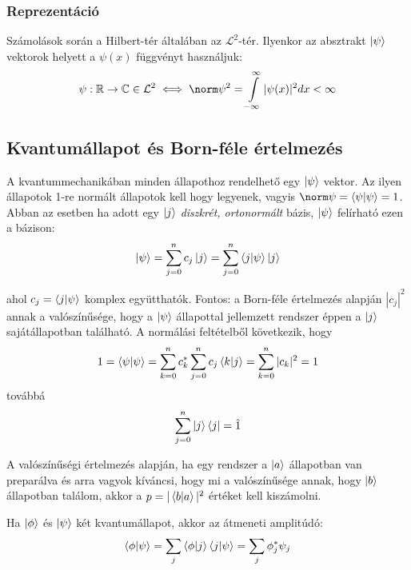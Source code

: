 \subsubsection{Reprezentáció}
Számolások során a Hilbert-tér általában az $\mathcal{L}^2$-tér.
Ilyenkor az absztrakt $\ket\psi$ vektorok helyett a $\psi(x)$ függvényt használjuk:
\begin{equation}
    \psi: \mathbb{R} \rightarrow \mathbb{C} \in \mathcal{L}^2 \iff \norm \psi^2 = \int\limits_{-\infty}^{\infty} |\psi(x)|^2 dx < \infty
\end{equation}

\subsection{Kvantumállapot és Born-féle értelmezés}
A kvantummechanikában minden állapothoz rendelhető egy $\ket\psi$ vektor.
Az ilyen állapotok 1-re normált állapotok kell hogy legyenek, vagyis
$\norm \psi = \braket{\psi|\psi} = 1$.
Abban az esetben ha adott egy $\ket j$ \textit{diszkrét, ortonormált} bázis, $\ket \psi$ felírható ezen a bázison:
\begin{equation}
    \ket\psi = \sum\limits_{j=0}^{n} c_j\ket j = \sum\limits_{j=0}^{n} \braket{j|\psi}\ket j
\end{equation}

ahol  $c_j = \braket{j|\psi}$ komplex együtthatók. Fontos: a Born-féle értelmezés alapján $|c_j|^2$ annak a valószínűsége, hogy a $\ket\psi$ állapottal jellemzett
rendszer éppen a $\ket j$ sajátállapotban található.
A normálási feltételből következik, hogy 
\begin{equation}
    1=\braket{\psi|\psi} = \sum\limits_{k=0}^{n} c_k^* \sum\limits_{j=0}^{n} c_j \braket{k|j} = \sum\limits_{k=0}^{n} |c_k|^2 = 1
\end{equation}
továbbá
\begin{equation}
    \sum\limits_{j=0}^{n} \ket j \bra j = \hat{1}
\end{equation}

A valószínűségi értelmezés alapján, ha egy rendszer a $\ket a$ állapotban van preparálva és arra vagyok kíváncsi, hogy mi a valószínűsége annak,
hogy $\ket b$ állapotban találom, akkor a $p = |\braket{b|a}|^2$ értéket kell kiszámolni.

Ha $\ket\phi$ és $\ket\psi$ két kvantumállapot, akkor az átmeneti amplitúdó:
\begin{equation}
    \braket{\phi|\psi} = \sum\limits_j \braket{\phi|j}\braket{j|\psi} = \sum\limits_j \phi_j^{*}\psi_j
\end{equation}
